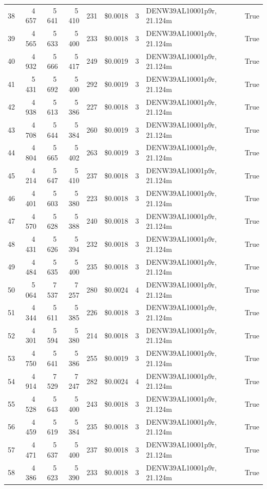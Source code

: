 \documentclass[a4paper,11pt]{article}
\begin{document}
\begin{table}[ht]
\begin{tabular}{r r r r r r r p{3cm} l}
38 & 4\,657 & 5\,641 & 5\,410 & 231 & \$0.0018 & 3 & DENW39AL10001p9r, 21.124m & True \\
39 & 4\,565 & 5\,633 & 5\,400 & 233 & \$0.0018 & 3 & DENW39AL10001p9r, 21.124m & True \\
40 & 4\,932 & 5\,666 & 5\,417 & 249 & \$0.0019 & 3 & DENW39AL10001p9r, 21.124m & True \\
41 & 5\,431 & 5\,692 & 5\,400 & 292 & \$0.0019 & 3 & DENW39AL10001p9r, 21.124m & True \\
42 & 4\,938 & 5\,613 & 5\,386 & 227 & \$0.0018 & 3 & DENW39AL10001p9r, 21.124m & True \\
43 & 4\,708 & 5\,644 & 5\,384 & 260 & \$0.0019 & 3 & DENW39AL10001p9r, 21.124m & True \\
44 & 4\,804 & 5\,665 & 5\,402 & 263 & \$0.0019 & 3 & DENW39AL10001p9r, 21.124m & True \\
45 & 4\,214 & 5\,647 & 5\,410 & 237 & \$0.0018 & 3 & DENW39AL10001p9r, 21.124m & True \\
46 & 4\,401 & 5\,603 & 5\,380 & 223 & \$0.0018 & 3 & DENW39AL10001p9r, 21.124m & True \\
47 & 4\,570 & 5\,628 & 5\,388 & 240 & \$0.0018 & 3 & DENW39AL10001p9r, 21.124m & True \\
48 & 4\,431 & 5\,626 & 5\,394 & 232 & \$0.0018 & 3 & DENW39AL10001p9r, 21.124m & True \\
49 & 4\,484 & 5\,635 & 5\,400 & 235 & \$0.0018 & 3 & DENW39AL10001p9r, 21.124m & True \\
50 & 5\,064 & 7\,537 & 7\,257 & 280 & \$0.0024 & 4 & DENW39AL10001p9r, 21.124m & True \\
51 & 4\,344 & 5\,611 & 5\,385 & 226 & \$0.0018 & 3 & DENW39AL10001p9r, 21.124m & True \\
52 & 4\,301 & 5\,594 & 5\,380 & 214 & \$0.0018 & 3 & DENW39AL10001p9r, 21.124m & True \\
53 & 4\,750 & 5\,641 & 5\,386 & 255 & \$0.0019 & 3 & DENW39AL10001p9r, 21.124m & True \\
54 & 4\,914 & 7\,529 & 7\,247 & 282 & \$0.0024 & 4 & DENW39AL10001p9r, 21.124m & True \\
55 & 4\,528 & 5\,643 & 5\,400 & 243 & \$0.0018 & 3 & DENW39AL10001p9r, 21.124m & True \\
56 & 4\,459 & 5\,619 & 5\,384 & 235 & \$0.0018 & 3 & DENW39AL10001p9r, 21.124m & True \\
57 & 4\,471 & 5\,637 & 5\,400 & 237 & \$0.0018 & 3 & DENW39AL10001p9r, 21.124m & True \\
58 & 4\,386 & 5\,623 & 5\,390 & 233 & \$0.0018 & 3 & DENW39AL10001p9r, 21.124m & True \\

\end{tabular}
\end{table}
\end{document}
